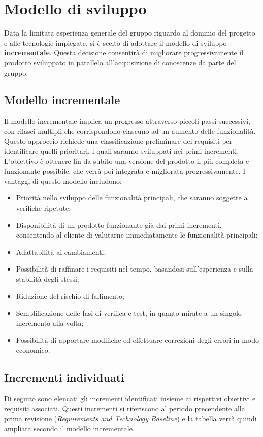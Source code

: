 

\section{Modello di sviluppo}
Data la limitata esperienza generale del gruppo riguardo al dominio del progetto
e alle tecnologie impiegate, si è scelto di adottare il modello di sviluppo \textbf{incrementale}.
Questa decisione consentirà di migliorare progressivamente il prodotto sviluppato in parallelo
all'acquisizione di conoscenze da parte del gruppo.
\subsection{Modello incrementale}
Il modello incrementale implica un progresso attraverso piccoli passi successivi, con rilasci 
multipli che corrispondono ciascuno ad un aumento delle funzionalità. Questo approccio richiede una
classificazione preliminare dei requisiti per identificare quelli prioritari, i quali saranno sviluppati 
nei primi incrementi. L'obiettivo è ottenere fin da subito una versione del prodotto il più completa e funzionante
possibile, che verrà poi integrata e migliorata progressivamente. I vantaggi di questo modello includono:
\begin{itemize}
    \item Priorità nello sviluppo delle funzionalità principali, che saranno soggette a verifiche ripetute;
    \item Disponibilità di un prodotto funzionante già dai primi incrementi, consentendo al cliente di valutarne immediatamente le funzionalità principali;
    \item Adattabilità ai cambiamenti;
    \item Possibilità di raffinare i requisiti nel tempo, basandosi sull'esperienza e sulla stabilità degli stessi;
    \item Riduzione del rischio di fallimento;
    \item Semplificazione delle fasi di verifica e test, in quanto mirate a un singolo incremento alla volta;
    \item Possibilità di apportare modifiche ed effettuare correzioni degli errori in modo economico.
\end{itemize}
\subsection{Incrementi individuati}
Di seguito sono elencati gli incrementi identificati insieme ai rispettivi obiettivi e requisiti associati.
Questi incrementi si riferiscono al periodo precendente alla prima revisione (\emph{Requirements and Technology Baseline}) e 
la tabella verrà quindi ampliata secondo il modello incrementale.

